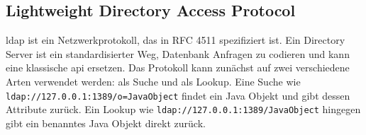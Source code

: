 
\subsection{Lightweight Directory Access Protocol}\label{subsec:ldap}
\gls{ldap} ist ein Netzwerkprotokoll, das in RFC 4511 spezifiziert ist.
Ein  Directory Server ist ein standardisierter Weg, Datenbank Anfragen zu codieren und kann eine klassische \gls{api} ersetzen.
Das  Protokoll kann zunächst auf zwei verschiedene Arten verwendet werden: als Suche und als Lookup.
Eine Suche wie \verb|ldap://127.0.0.1:1389/o=JavaObject| findet ein Java Objekt und gibt dessen Attribute zurück.
Ein Lookup wie \verb|ldap://127.0.0.1:1389/JavaObject| hingegen gibt ein benanntes Java Objekt direkt zurück.
